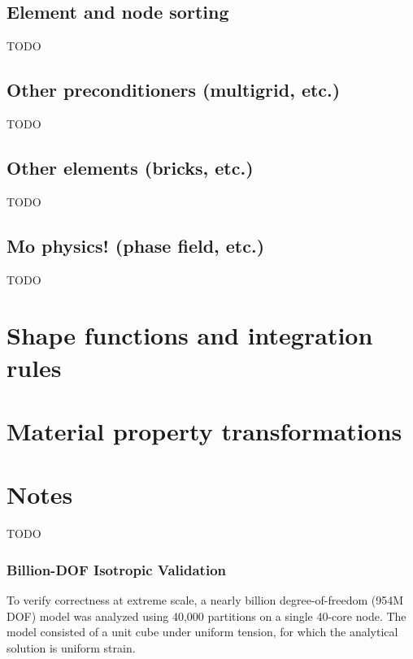 \documentclass[]             %
{NASA}                       %
\begin{document}
\subsection{Element and node sorting}
\label{subsec:Renumbering}

TODO

\subsection{Other preconditioners (multigrid, etc.)}
\label{subsec:Other-Preconditioners}

TODO

\subsection{Other elements (bricks, etc.)}
\label{subsec:Other-Elements-1}

TODO

\subsection{Mo physics! (phase field, etc.)}
\label{subsec:Mo-physics!}

TODO

\appendix


\section{Shape functions and integration rules}
\label{app:shapes-integration}

\section{Material property transformations}
\label{app:mtrl-xform}

\section*{Notes}

TODO

\subsubsection{Billion-DOF Isotropic Validation}

To verify correctness at extreme scale, a nearly billion degree-of-freedom
(954M DOF) model was analyzed using 40,000 partitions on a single 40-core
node. The model consisted of a unit cube under uniform tension, for which
the analytical solution is uniform strain.
\end{document}
